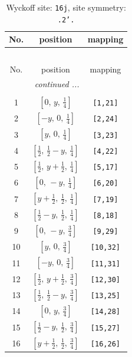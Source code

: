 \documentclass[fleqn,8pt]{jsarticle}
\begin{document}
\renewcommand{\arraystretch}{1.2}
\begin{longtable}{ccc}
\caption{Wyckoff site: {\tt 16j}, site symmetry: {\tt .2'.}}
 \\
 \hline \hline
No. & position & mapping \\ \hline \endfirsthead

\multicolumn{2}{l}{\tablename\ \thetable{}} \\
 \hline \hline
No. & position & mapping \\ \hline \endhead

 \hline \hline
\multicolumn{2}{r}{\footnotesize\it continued ...} \\ \endfoot

 \hline \hline
\multicolumn{2}{r}{} \\ \endlastfoot

1 & $\left[ 0,\, y,\, \frac{1}{4} \right]$ & {\tt [1,21]} \\ \hline
2 & $\left[ - y,\, 0,\, \frac{1}{4} \right]$ & {\tt [2,24]} \\ \hline
3 & $\left[ y,\, 0,\, \frac{1}{4} \right]$ & {\tt [3,23]} \\ \hline
4 & $\left[ \frac{1}{2},\, \frac{1}{2} - y,\, \frac{1}{4} \right]$ & {\tt [4,22]} \\ \hline
5 & $\left[ \frac{1}{2},\, y + \frac{1}{2},\, \frac{1}{4} \right]$ & {\tt [5,17]} \\ \hline
6 & $\left[ 0,\, - y,\, \frac{1}{4} \right]$ & {\tt [6,20]} \\ \hline
7 & $\left[ y + \frac{1}{2},\, \frac{1}{2},\, \frac{1}{4} \right]$ & {\tt [7,19]} \\ \hline
8 & $\left[ \frac{1}{2} - y,\, \frac{1}{2},\, \frac{1}{4} \right]$ & {\tt [8,18]} \\ \hline
9 & $\left[ 0,\, - y,\, \frac{3}{4} \right]$ & {\tt [9,29]} \\ \hline
10 & $\left[ y,\, 0,\, \frac{3}{4} \right]$ & {\tt [10,32]} \\ \hline
11 & $\left[ - y,\, 0,\, \frac{3}{4} \right]$ & {\tt [11,31]} \\ \hline
12 & $\left[ \frac{1}{2},\, y + \frac{1}{2},\, \frac{3}{4} \right]$ & {\tt [12,30]} \\ \hline
13 & $\left[ \frac{1}{2},\, \frac{1}{2} - y,\, \frac{3}{4} \right]$ & {\tt [13,25]} \\ \hline
14 & $\left[ 0,\, y,\, \frac{3}{4} \right]$ & {\tt [14,28]} \\ \hline
15 & $\left[ \frac{1}{2} - y,\, \frac{1}{2},\, \frac{3}{4} \right]$ & {\tt [15,27]} \\ \hline
16 & $\left[ y + \frac{1}{2},\, \frac{1}{2},\, \frac{3}{4} \right]$ & {\tt [16,26]} \\
\end{longtable}
\end{document}
